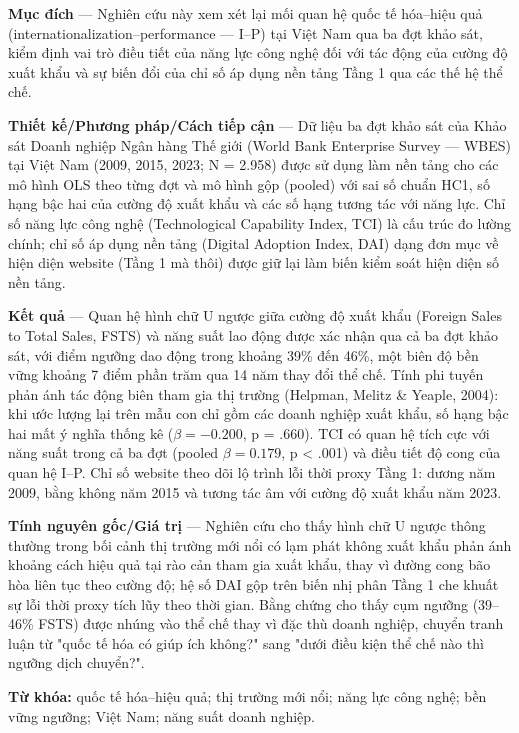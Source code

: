 \documentclass[12pt,a4paper]{article}
\begin{document}
\textbf{Mục đích} --- Nghiên cứu này xem xét lại mối quan hệ quốc tế
hóa--hiệu quả (internationalization--performance --- I--P) tại Việt Nam
qua ba đợt khảo sát, kiểm định vai trò điều tiết của năng lực công nghệ
đối với tác động của cường độ xuất khẩu và sự biến đổi của chỉ số áp
dụng nền tảng Tầng 1 qua các thế hệ thể chế.

\textbf{Thiết kế/Phương pháp/Cách tiếp cận} --- Dữ liệu ba đợt khảo sát
của Khảo sát Doanh nghiệp Ngân hàng Thế giới (World Bank Enterprise
Survey --- WBES) tại Việt Nam (2009, 2015, 2023; N = 2.958) được sử dụng
làm nền tảng cho các mô hình OLS theo từng đợt và mô hình gộp (pooled)
với sai số chuẩn HC1, số hạng bậc hai của cường độ xuất khẩu và các số
hạng tương tác với năng lực. Chỉ số năng lực công nghệ (Technological
Capability Index, TCI) là cấu trúc đo lường chính; chỉ số áp dụng nền
tảng (Digital Adoption Index, DAI) dạng đơn mục về hiện diện website
(Tầng 1 mà thôi) được giữ lại làm biến kiểm soát hiện diện số nền tảng.

\textbf{Kết quả} --- Quan hệ hình chữ U ngược giữa cường độ xuất khẩu
(Foreign Sales to Total Sales, FSTS) và năng suất lao động được xác nhận
qua cả ba đợt khảo sát, với điểm ngưỡng dao động trong khoảng 39\% đến
46\%, một biên độ bền vững khoảng 7 điểm phần trăm qua 14 năm thay đổi
thể chế. Tính phi tuyến phản ánh tác động biên tham gia thị trường
(Helpman, Melitz \& Yeaple, 2004): khi ước lượng lại trên mẫu con chỉ
gồm các doanh nghiệp xuất khẩu, số hạng bậc hai mất ý nghĩa thống kê
(\(\beta = −0.200\), p = .660). TCI có quan hệ tích cực với năng suất
trong cả ba đợt (pooled \(\beta = 0.179\), p \textless{} .001) và điều
tiết độ cong của quan hệ I--P. Chỉ số website theo dõi lộ trình lỗi thời
proxy Tầng 1: dương năm 2009, bằng không năm 2015 và tương tác âm với
cường độ xuất khẩu năm 2023.

\textbf{Tính nguyên gốc/Giá trị} --- Nghiên cứu cho thấy hình chữ U
ngược thông thường trong bối cảnh thị trường mới nổi có lạm phát không
xuất khẩu phản ánh khoảng cách hiệu quả tại rào cản tham gia xuất khẩu,
thay vì đường cong bão hòa liên tục theo cường độ; hệ số DAI gộp trên
biến nhị phân Tầng 1 che khuất sự lỗi thời proxy tích lũy theo thời
gian. Bằng chứng cho thấy cụm ngưỡng (39--46\% FSTS) được nhúng vào thể
chế thay vì đặc thù doanh nghiệp, chuyển tranh luận từ "quốc tế hóa có
giúp ích không?" sang "dưới điều kiện thể chế nào thì ngưỡng dịch
chuyển?".

\textbf{Từ khóa:} quốc tế hóa--hiệu quả; thị trường mới nổi; năng lực
công nghệ; bền vững ngưỡng; Việt Nam; năng suất doanh nghiệp.
\end{document}
